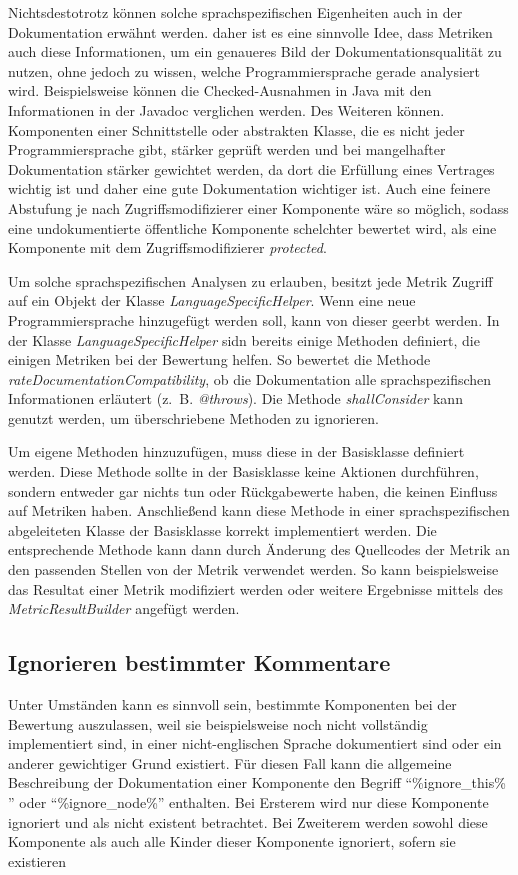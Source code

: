 Nichtsdestotrotz können solche sprachspezifischen Eigenheiten auch in der Dokumentation erwähnt werden. daher ist es eine sinnvolle Idee, dass Metriken auch diese Informationen, um ein genaueres Bild der Dokumentationsqualität zu nutzen, ohne jedoch zu wissen, welche Programmiersprache gerade analysiert wird. Beispielsweise können die Checked-Ausnahmen in Java mit den Informationen in der Javadoc verglichen werden. Des Weiteren können. Komponenten einer Schnittstelle oder abstrakten Klasse, die es nicht jeder Programmiersprache gibt, stärker geprüft werden und bei mangelhafter Dokumentation stärker gewichtet werden, da dort die Erfüllung eines Vertrages wichtig ist und daher eine gute Dokumentation wichtiger ist. Auch eine feinere Abstufung je nach Zugriffsmodifizierer einer Komponente wäre so möglich, sodass eine undokumentierte öffentliche Komponente schelchter bewertet wird, als eine Komponente mit dem Zugriffsmodifizierer  \textit{protected}. 

Um solche sprachspezifischen Analysen zu erlauben, besitzt jede Metrik Zugriff auf ein Objekt der Klasse \textit{LanguageSpecificHelper}. Wenn eine neue Programmiersprache hinzugefügt werden soll, kann von dieser geerbt werden. In der Klasse \textit{LanguageSpecificHelper} sidn bereits einige Methoden definiert, die einigen Metriken bei der Bewertung helfen. So bewertet die Methode \textit{rateDocumentationCompatibility}, ob die Dokumentation alle sprachspezifischen Informationen erläutert (z.~B. \textit{@throws}). Die Methode \textit{shallConsider} kann genutzt werden, um überschriebene Methoden zu ignorieren. 

Um eigene Methoden hinzuzufügen, muss diese in der Basisklasse definiert werden. Diese Methode sollte in der Basisklasse keine Aktionen durchführen, sondern entweder gar nichts tun oder Rückgabewerte haben, die keinen Einfluss auf Metriken haben. Anschließend kann diese Methode in einer sprachspezifischen abgeleiteten Klasse der Basisklasse korrekt implementiert werden. Die entsprechende Methode kann dann durch Änderung des Quellcodes der Metrik an den passenden Stellen von der Metrik verwendet werden. So kann beispielsweise das Resultat einer Metrik modifiziert werden oder weitere Ergebnisse mittels des \textit{MetricResultBuilder} angefügt werden. 

\subsection{Ignorieren bestimmter Kommentare}

Unter Umständen kann es sinnvoll sein, bestimmte Komponenten bei der Bewertung auszulassen, weil sie beispielsweise noch nicht vollständig implementiert sind, in einer nicht-englischen Sprache dokumentiert sind oder ein anderer gewichtiger Grund existiert. Für diesen Fall kann die allgemeine Beschreibung der Dokumentation einer Komponente  den Begriff \enquote{\%ignore\_this\% } oder \enquote{\%ignore\_node\%} enthalten. Bei Ersterem wird nur diese Komponente ignoriert und als nicht existent betrachtet. Bei Zweiterem werden sowohl diese Komponente als auch alle Kinder dieser Komponente ignoriert, sofern sie existieren

